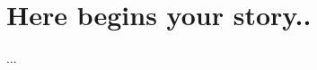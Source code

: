 \documentclass[a4paper, 12pt, oneside, times, print, NoDraft]{template/UBtemplate}
\begin{document}




\frontmatter %







\mainmatter %








\chapter{Here begins your story..}

...








\end{document}
